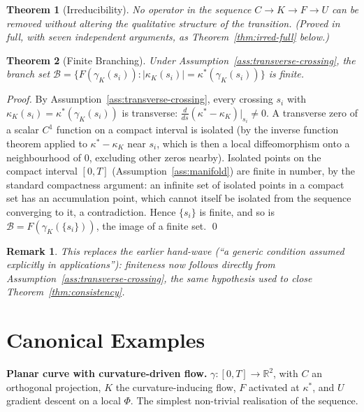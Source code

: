 \documentclass[14pt,a4paper]{extarticle}
\newtheorem{theorem}{Theorem}[section]
\newtheorem{remark}{Remark}[section]
\begin{document}
\begin{theorem}[Irreducibility]
\label{thm:irred}
No operator in the sequence $C \to K \to F \to U$ can be removed
without altering the qualitative structure of the transition. (Proved
in full, with seven independent arguments, as
Theorem~\ref{thm:irred-full} below.)
\end{theorem}

\begin{theorem}[Finite Branching]
\label{thm:finite}
Under Assumption~\ref{ass:transverse-crossing}, the branch set
$\mathcal{B} = \{F(\gamma_K(s_i)) : |\kappa_K(s_i)| = \kappa^*(\gamma_K(s_i))\}$
is finite.
\end{theorem}

\begin{proof}
By Assumption~\ref{ass:transverse-crossing}, every crossing
$s_i$ with $\kappa_K(s_i)=\kappa^*(\gamma_K(s_i))$ is transverse:
$\frac{d}{ds}(\kappa^*-\kappa_K)\big|_{s_i}\neq0$. A transverse zero of
a scalar $C^1$ function on a compact interval is isolated (by the
inverse function theorem applied to $\kappa^*-\kappa_K$ near $s_i$,
which is then a local diffeomorphism onto a neighbourhood of $0$,
excluding other zeros nearby). Isolated points on the compact interval
$[0,T]$ (Assumption~\ref{ass:manifold}) are finite in number, by the
standard compactness argument: an infinite set of isolated points in a
compact set has an accumulation point, which cannot itself be isolated
from the sequence converging to it, a contradiction. Hence
$\{s_i\}$ is finite, and so is $\mathcal{B}=F(\gamma_K(\{s_i\}))$, the
image of a finite set.
\qed
\end{proof}

\begin{remark}
This replaces the earlier hand-wave (``a generic condition assumed
explicitly in applications''): finiteness now follows directly from
Assumption~\ref{ass:transverse-crossing}, the same hypothesis used to
close Theorem~\ref{thm:consistency}.

\end{remark}

\section{Canonical Examples}
\label{sec:examples}

\textbf{Planar curve with curvature-driven flow.}
$\gamma : [0,T] \to \mathbb{R}^2$, with $C$ an orthogonal projection,
$K$ the curvature-inducing flow, $F$ activated at $\kappa^*$, and $U$
gradient descent on a local $\Phi$.
The simplest non-trivial realisation of the sequence.
\end{document}
